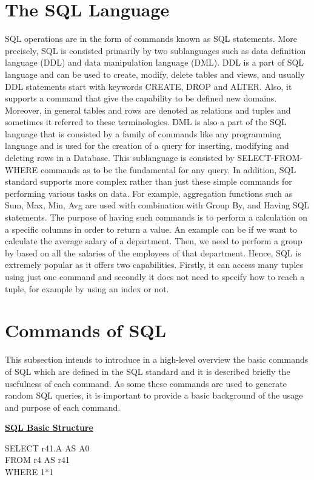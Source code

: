 \section{The SQL Language}
SQL operations are in the form of commands known as SQL statements. More precisely, SQL is consisted primarily by two sublanguages such as data definition language (DDL) and data manipulation language (DML). DDL is a part of SQL language and can be used to create, modify, delete tables and views, and usually DDL statements start with keywords CREATE, DROP and ALTER. Also, it supports a command that give the capability to be defined new domains. Moreover, in general tables and rows are denoted as relations and tuples and sometimes it referred to these terminologies. DML is also a part of the SQL language that is consisted by a family of commands like any programming language and is used for the creation of a query for inserting, modifying and deleting rows in a Database. This sublanguage is consisted by SELECT-FROM-WHERE commands as to be the fundamental for any query. In addition, SQL standard supports more complex rather than just these simple commands for performing various tasks on data. For example, aggregation functions such as Sum, Max, Min, Avg are used with combination with Group By, and Having SQL statements. The purpose of having such commands is to perform a calculation on a specific  columns in order to return a value. An example can be if we want to calculate the average salary of a department. Then, we need to perform a group by based on all the salaries of the employees of that department. 
Hence, SQL is extremely popular as it offers two capabilities. Firstly, it can access many tuples using just one command and secondly it does not need to specify how to reach a tuple, for example by using an index or not. 

\section{Commands of SQL}

This subsection intends to introduce in a high-level overview the basic commands of SQL which are defined in the SQL standard and it is described briefly the usefulness of each command. As some these commands are used to generate random SQL queries, it is important to provide a basic background of the usage and purpose of each command. 

\textbf{\underline{SQL Basic Structure} }
 
\begin{mdframed}[backgroundcolor=gray!20] 
SELECT r41.A AS A0
\\FROM r4 AS r41
\\WHERE 1*1
\end{mdframed}

